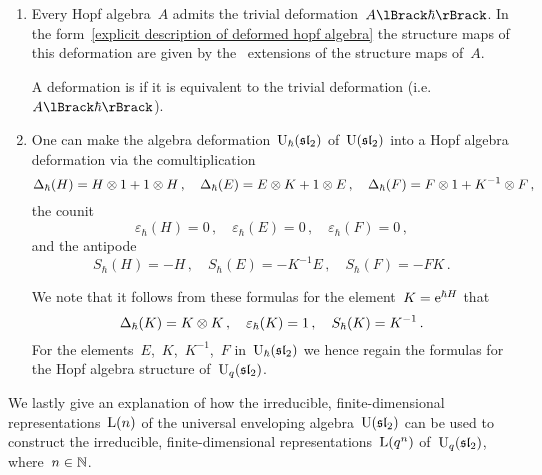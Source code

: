 \documentclass[a4paper, 11pt, oneside]{scrartcl}
\begin{document}
\begin{example}
  \leavevmode
  \begin{enumerate}
    \item
      Every Hopf algebra~$A$ admits the trivial deformation~$\power{A}{\hbar}$.
      In the form~\eqref{explicit description of deformed hopf algebra} the structure maps of this deformation are given by the~\linear{$\kfhbar$} extensions of the structure maps of~$A$.

      A deformation is  if it is equivalent to the trivial deformation (i.e.~$\power{A}{\hbar}$).
    \item
      One can make the algebra deformation~$\operatorname{U}_{\hbar}(\mathfrak{sl}_2)$ of~$\operatorname{U}(\mathfrak{sl}_2)$ into a Hopf algebra deformation via the comultiplication
      \[
        \Delta_{\hbar}(H) = H \otimes 1 + 1 \otimes H \,,
        \quad
        \Delta_{\hbar}(E) = E \otimes K + 1 \otimes E \,,
        \quad
        \Delta_{\hbar}(F) = F \otimes 1 + K^{-1} \otimes F \,,
      \]
      the counit
      \[
        \varepsilon_{\hbar}(H) = 0 \,,
        \quad
        \varepsilon_{\hbar}(E) = 0 \,,
        \quad
        \varepsilon_{\hbar}(F) = 0 \,,
      \]
      and the antipode
      \[
        S_{\hbar}(H) = - H \,,
        \quad
        S_{\hbar}(E) = - K^{-1} E \,,
        \quad
        S_{\hbar}(F) = - F K \,.
      \]

      We note that it follows from these formulas for the element~$K = \mathrm{e}^{\hbar H}$ that
      \[
        \Delta_{\hbar}(K) = K \otimes K \,,
        \quad
        \varepsilon_{\hbar}(K) = 1 \,,
        \quad
        S_{\hbar}(K) = K^{-1} \,.
      \]
      For the elements~$E$,~$K$,~$K^{-1}$,~$F$ in~$\operatorname{U}_{\hbar}(\mathfrak{sl}_2)$ we hence regain the formulas for the Hopf algebra structure of~$\operatorname{U}_q(\mathfrak{sl}_2)$.
  \end{enumerate}
\end{example}

We lastly give an explanation of how the irreducible, finite-dimensional representations~$\operatorname{L}(n)$ of the universal enveloping algebra~$\operatorname{U}(\mathfrak{sl}_2)$ can be used to construct the irreducible, finite-dimensional representations~$\operatorname{L}(q^n)$ of~$\operatorname{U}_q(\mathfrak{sl}_2)$, where~$n \in \mathbb{N}$.
\end{document}
